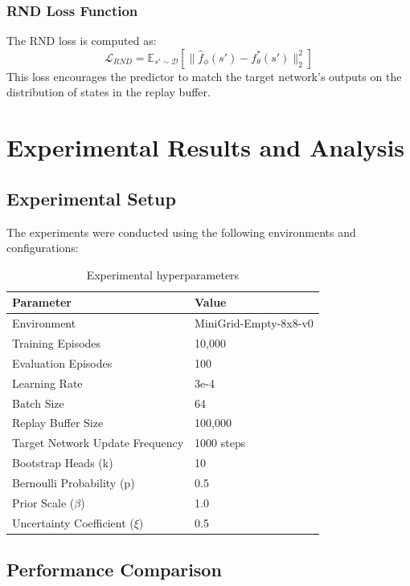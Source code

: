\documentclass[12pt]{article}
\begin{document}
{{{\subsubsection{RND Loss Function}
The RND loss is computed as:
\begin{equation}
\mathcal{L}_{RND} = \mathbb{E}_{s' \sim \mathcal{D}} \left[ \|\hat{f}_\phi(s') - f^*_\theta(s')\|_2^2 \right]
\end{equation}
This loss encourages the predictor to match the target network's outputs on the distribution of states in the replay buffer.

\section{Experimental Results and Analysis}

\subsection{Experimental Setup}

The experiments were conducted using the following environments and configurations:

\begin{table}[H]
\centering
\renewcommand{\arraystretch}{1.3}
\begin{tabular}{ll}
\toprule
\textbf{Parameter} & \textbf{Value} \\
\midrule
Environment & MiniGrid-Empty-8x8-v0 \\
Training Episodes & 10,000 \\
Evaluation Episodes & 100 \\
Learning Rate & 3e-4 \\
Batch Size & 64 \\
Replay Buffer Size & 100,000 \\
Target Network Update Frequency & 1000 steps \\
Bootstrap Heads (k) & 10 \\
Bernoulli Probability (p) & 0.5 \\
Prior Scale ($\beta$) & 1.0 \\
Uncertainty Coefficient ($\xi$) & 0.5 \\
\bottomrule
\end{tabular}
\caption{Experimental hyperparameters}
\end{table}

\subsection{Performance Comparison}

}}}
\end{document}
